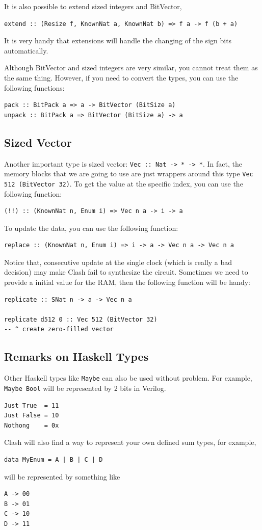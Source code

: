 \documentclass[a4paper,12pt, oneside]{book}
\begin{document}
It is also possible to extend sized integers and BitVector,
\begin{verbatim}
extend :: (Resize f, KnownNat a, KnownNat b) => f a -> f (b + a)
\end{verbatim}
It is very handy that extensions will handle the changing of the sign bits automatically.

Although BitVector and sized integers are very similar, you cannot treat them as the same thing. However, if you need to convert the types, you can use the following functions:
\begin{verbatim}
pack :: BitPack a => a -> BitVector (BitSize a)
unpack :: BitPack a => BitVector (BitSize a) -> a
\end{verbatim}
\subsection{Sized Vector}
Another important type is sized vector: \texttt{Vec :: Nat -> * -> *}. In fact, the memory blocks that we are going to use are just wrappers around this type \texttt{Vec 512 (BitVector 32)}.
To get the value at the specific index, you can use the following function:
\begin{verbatim}
(!!) :: (KnownNat n, Enum i) => Vec n a -> i -> a
\end{verbatim}
To update the data, you can use the following function:
\begin{verbatim}
replace :: (KnownNat n, Enum i) => i -> a -> Vec n a -> Vec n a
\end{verbatim}
Notice that, consecutive update at the single clock (which is really a bad decision) may make Clash fail to synthesize the circuit.
Sometimes we need to provide a initial value for the RAM, then
the following function will be handy:
\begin{verbatim}
replicate :: SNat n -> a -> Vec n a

replicate d512 0 :: Vec 512 (BitVector 32) 
-- ^ create zero-filled vector
\end{verbatim}
\subsection{Remarks on Haskell Types}
Other Haskell types like \texttt{Maybe} can also be used without problem. For example, \texttt{Maybe Bool} will be represented by 2 bits in Verilog.
\begin{verbatim}
Just True  = 11
Just False = 10
Nothong    = 0x
\end{verbatim}
Clash will also find a way to represent your own defined sum types, for example,
\begin{verbatim}
data MyEnum = A | B | C | D
\end{verbatim}
will be represented by something like
\begin{verbatim}
A -> 00
B -> 01
C -> 10
D -> 11
\end{verbatim}
\end{document}
